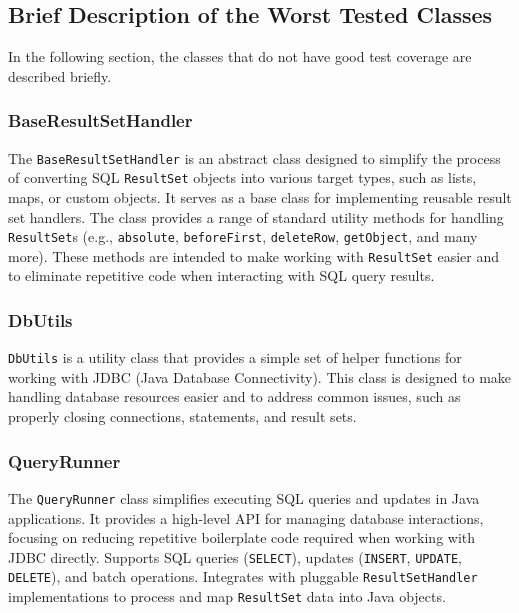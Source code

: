 \documentclass[sigconf]{acmart}
\begin{document}
\subsection*{Brief Description of the Worst Tested Classes}

In the following section, the classes that do not have good test coverage are described briefly.

\subsubsection*{\textbf{BaseResultSetHandler}}

The \texttt{BaseResultSetHandler} is an abstract class designed to simplify the process of converting SQL \texttt{ResultSet} objects into various target types, such as lists, maps, or custom objects. It serves as a base class for implementing reusable result set handlers. The class provides a range of standard utility methods for handling \texttt{ResultSet}s (e.g., \texttt{absolute}, \texttt{beforeFirst}, \texttt{deleteRow}, \texttt{getObject}, and many more). These methods are intended to make working with \texttt{ResultSet} easier and to eliminate repetitive code when interacting with SQL query results.

\subsubsection*{\textbf{DbUtils}}

\texttt{DbUtils} is a utility class that provides a simple set of helper functions for working with JDBC (Java Database Connectivity). This class is designed to make handling database resources easier and to address common issues, such as properly closing connections, statements, and result sets.

\subsubsection*{\textbf{QueryRunner}}

The \texttt{QueryRunner} class simplifies executing SQL queries and updates in Java applications. It provides a high-level API for managing database interactions, focusing on reducing repetitive boilerplate code required when working with JDBC directly. Supports SQL queries (\texttt{SELECT}), updates (\texttt{INSERT}, \texttt{UPDATE}, \texttt{DELETE}), and batch operations. Integrates with pluggable \texttt{ResultSetHandler} implementations to process and map \texttt{ResultSet} data into Java objects.
\end{document}
